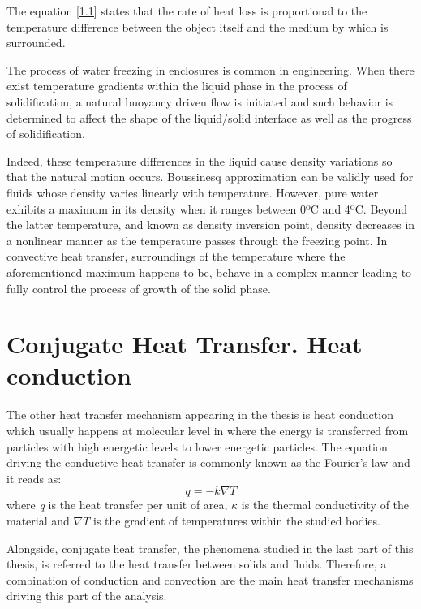 \noindent The equation \ref{1.1} states that the rate of heat loss is proportional to the temperature difference between the object itself and the medium by which is surrounded.

\noindent The process of water freezing in enclosures is common in engineering. When there exist temperature gradients within the liquid phase in the process of solidification, a natural buoyancy driven flow is initiated and such behavior is determined to affect the shape of the liquid/solid interface as well as the progress of solidification.

\noindent Indeed, these temperature differences in the liquid cause density variations so that the natural motion occurs. Boussinesq approximation can be validly used for fluids whose density varies linearly with temperature. However, pure water exhibits a maximum in its density when it ranges between 0ºC and 4ºC. Beyond the latter temperature, and known as density inversion point, density decreases in a nonlinear manner as the temperature passes through the freezing point. In convective heat transfer, surroundings of the temperature where the aforementioned maximum happens to be, behave in a complex manner leading to fully control the process of growth of the solid phase.


\section{Conjugate Heat Transfer. Heat conduction}
\setlength{\parindent}{0.5cm} The other heat transfer mechanism appearing in the thesis is heat conduction which usually happens at molecular level in where the energy is transferred from particles with high energetic levels to lower energetic particles. The equation driving the conductive heat transfer is commonly known as the Fourier's law and it reads as: 
\begin{equation}
	q=-k \nabla T
	\label{1.2}
\end{equation}
where \textit{q} is the heat transfer per unit of area, $\kappa$ is the thermal conductivity of the material and $\nabla T$ is the gradient of temperatures within the studied bodies.

\noindent Alongside, conjugate heat transfer, the phenomena studied in the last part of this thesis, is referred to the heat transfer between solids and fluids. Therefore, a combination of conduction and convection are the main heat transfer mechanisms driving this part of the analysis.


